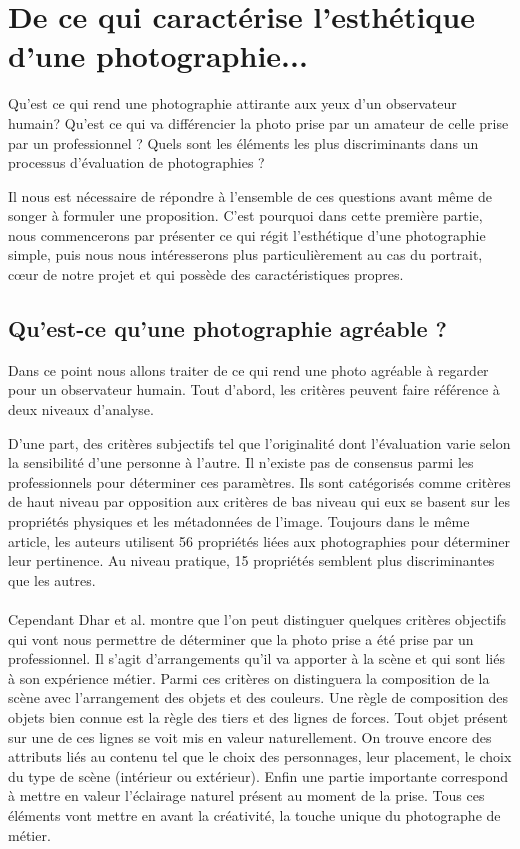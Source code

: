 \documentclass[11pt, french]{report-rd-info}
\begin{document}
\section{De ce qui caractérise l’esthétique d’une photographie...}


Qu’est ce qui rend une photographie attirante aux yeux d’un observateur humain? Qu’est ce qui va différencier la photo prise par un amateur de celle prise par un professionnel ? Quels sont les éléments les plus discriminants dans un processus d'évaluation de photographies ?


Il nous est nécessaire de répondre à l’ensemble de ces questions avant même de songer à formuler une proposition. C’est pourquoi dans cette première partie, nous commencerons par présenter ce qui régit l'esthétique d’une photographie simple, puis nous nous intéresserons plus particulièrement au cas du portrait, cœur de notre projet et qui possède des caractéristiques propres.



\subsection{Qu’est-ce qu’une photographie agréable ?}
Dans ce point nous allons traiter de ce qui rend une photo agréable à regarder pour un observateur humain. Tout d’abord, les critères peuvent faire référence à deux niveaux d'analyse.


D’une part, des critères subjectifs tel que l’originalité \cite{Datta} dont l’évaluation varie selon la sensibilité d’une personne à l’autre. Il n’existe pas de consensus parmi les professionnels pour déterminer ces paramètres. Ils sont catégorisés comme critères de haut niveau par opposition aux critères de bas niveau qui eux se basent sur les propriétés physiques et les métadonnées de l’image. Toujours dans le même article, les auteurs utilisent 56 propriétés liées aux photographies pour déterminer leur pertinence. Au niveau pratique, 15 propriétés semblent plus discriminantes que les autres.
\paragraph*{}
Cependant Dhar et al. \cite{Dhar} montre que l’on peut distinguer quelques critères objectifs qui vont nous permettre de déterminer que la photo prise a été prise par un professionnel. Il s’agit  d’arrangements qu’il va apporter à la scène et qui sont liés à son expérience métier. Parmi ces critères on distinguera la composition de la scène avec l'arrangement des objets et des couleurs. Une règle de composition des objets bien connue est la règle des tiers et des lignes de forces. Tout objet présent sur une de ces lignes se voit mis en valeur naturellement. On trouve encore des attributs liés au contenu tel que le choix des personnages, leur placement, le choix du type de scène (intérieur ou extérieur). Enfin une partie importante correspond à mettre en valeur l'éclairage naturel présent au moment de la prise. Tous ces éléments vont mettre en avant la créativité, la touche unique du photographe de métier.
\end{document}

